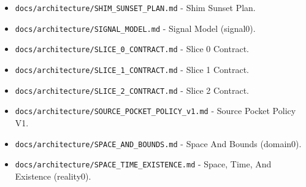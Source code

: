 \documentclass[9pt,a4paper,openany]{book}
\begin{document}
\begin{itemize}
\item \texttt{docs/\allowbreak{}architecture/\allowbreak{}SHIM\_\allowbreak{}SUNSET\_\allowbreak{}PLAN.\allowbreak{}md} -\allowbreak{} Shim Sunset Plan.\allowbreak{}
\end{itemize}

\begin{itemize}
\item \texttt{docs/\allowbreak{}architecture/\allowbreak{}SIGNAL\_\allowbreak{}MODEL.\allowbreak{}md} -\allowbreak{} Signal Model (signal0).\allowbreak{}
\end{itemize}

\begin{itemize}
\item \texttt{docs/\allowbreak{}architecture/\allowbreak{}SLICE\_\allowbreak{}0\_\allowbreak{}CONTRACT.\allowbreak{}md} -\allowbreak{} Slice 0 Contract.\allowbreak{}
\end{itemize}

\begin{itemize}
\item \texttt{docs/\allowbreak{}architecture/\allowbreak{}SLICE\_\allowbreak{}1\_\allowbreak{}CONTRACT.\allowbreak{}md} -\allowbreak{} Slice 1 Contract.\allowbreak{}
\end{itemize}

\begin{itemize}
\item \texttt{docs/\allowbreak{}architecture/\allowbreak{}SLICE\_\allowbreak{}2\_\allowbreak{}CONTRACT.\allowbreak{}md} -\allowbreak{} Slice 2 Contract.\allowbreak{}
\end{itemize}

\begin{itemize}
\item \texttt{docs/\allowbreak{}architecture/\allowbreak{}SOURCE\_\allowbreak{}POCKET\_\allowbreak{}POLICY\_\allowbreak{}v1.\allowbreak{}md} -\allowbreak{} Source Pocket Policy V1.\allowbreak{}
\end{itemize}

\begin{itemize}
\item \texttt{docs/\allowbreak{}architecture/\allowbreak{}SPACE\_\allowbreak{}AND\_\allowbreak{}BOUNDS.\allowbreak{}md} -\allowbreak{} Space And Bounds (domain0).\allowbreak{}
\end{itemize}

\begin{itemize}
\item \texttt{docs/\allowbreak{}architecture/\allowbreak{}SPACE\_\allowbreak{}TIME\_\allowbreak{}EXISTENCE.\allowbreak{}md} -\allowbreak{} Space, Time, And Existence (reality0).\allowbreak{}
\end{itemize}
\end{document}
